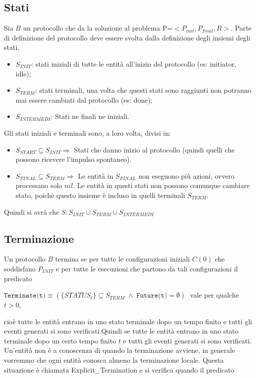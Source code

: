 \subsection{Stati}
Sia $B$ un protocollo che da la soluzione al problema P=$<P_{init}, P_{final}, R>$. Parte di definizione del protocollo deve essere svolta dalla definizione degli insiemi degli stati.
\begin{itemize}
  \item $S_{INIT}$: stati iniziali di tutte le entità all'inizio del protocollo (es: initiator, idle);
  \item $S_{TERM}$: stati terminali, una volta che questi stati sono raggiunti non potranno mai essere cambiati dal protocollo (es: done);
  \item $S_{INTERMEDI}$: Stati ne finali ne iniziali.
\end{itemize}

Gli stati iniziali e terminali sono, a loro volta, divisi in:
\begin{itemize}
  \item $S_{START}\subseteq S_{INIT} \Rightarrow$ Stati che danno inizio al protocollo (quindi quelli che possono ricevere l'impulso spontaneo).
  \item $S_{FINAL}\subseteq S_{TERM} \Rightarrow$ Le entità in $S_{FINAL}$ non eseguono più azioni, ovvero processano solo $nil$. Le entità in questi stati non possono comunque cambiare stato, poichè questo insieme è incluso in quelli terminali $S_{TERM}$.
\end{itemize}

Quindi si avrà che $S: S_{INIT} \cup S_{TERM} \cup S_{INTERMEDI}$

\subsection{Terminazione}
Un protocollo $B$ termina se per tutte le configurazioni iniziali $C(0)$ che soddisfano $P_{INIT}$ e per tutte le esecuzioni che partono da tali configurazioni il predicato 
\begin{center}
    $\texttt{Terminate(t)} \equiv (\{STATUS_t\} \subseteq S_{TERM} \; \wedge \; \texttt{Future(t)} = \emptyset) \;$ vale per qualche \; $t>0$,
\end{center}
cioè tutte le entità entrano in uno stato terminale dopo un tempo finito e tutti gli eventi generati si sono verificati.Quindi se tutte le entità entrano in uno stato terminale dopo un certo tempo finito $t$ e tutti gli eventi generati si sono verificati.\\
Un'entità non è a conoscenza di quando la terminazione avviene, in generale vorremmo che ogni entità conosca almeno la terminazione locale. Questa situazione è chiamata Explicit\_Termination e si verifica quando il predicato

